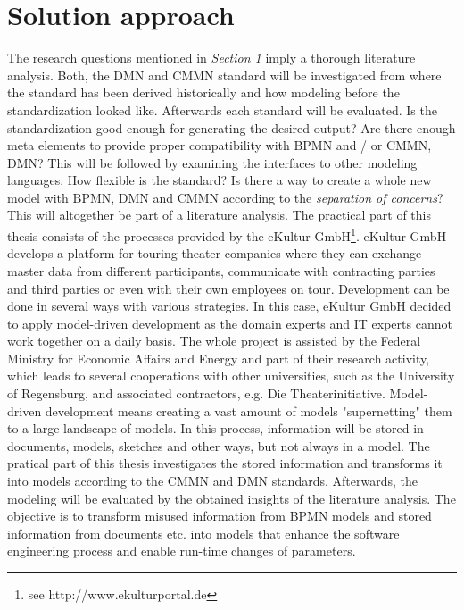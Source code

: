 \documentclass[11pt,a4paper,draft]{article}
\begin{document}
\section{Solution approach}
The research questions mentioned in \textit{Section 1} imply a thorough literature analysis. Both, the DMN and CMMN standard will be investigated from where the standard has been derived historically and how modeling before the standardization looked like. 
Afterwards each standard will be evaluated. Is the standardization good enough for generating the desired output? Are there enough meta elements to provide proper compatibility with BPMN and / or CMMN, DMN? This will be followed by examining the interfaces to other modeling languages. How flexible is the standard? Is there a way to create a whole new model with BPMN, DMN and CMMN according to the \textit{separation of concerns}? This will altogether be part of a literature analysis. 
The practical part of this thesis consists of the processes provided by the eKultur GmbH\footnote[1]{see http://www.ekulturportal.de}. eKultur GmbH develops a platform for touring theater companies where they can exchange master data from different participants, communicate with contracting parties and third parties or even with their own employees on tour. Development can be done in several ways with various strategies. In this case, eKultur GmbH decided to apply model-driven development as the domain experts and IT experts cannot work together on a daily basis. The whole project is assisted by the Federal Ministry for Economic Affairs and Energy and part of their research activity, which leads to several cooperations with other universities, such as the University of Regensburg, and associated contractors, e.g. Die Theaterinitiative. 
Model-driven development means creating a vast amount of models "supernetting" them to a large landscape of models. In this process, information will be stored in documents, models, sketches and other ways, but not always in a model. The pratical part of this thesis investigates the stored information and transforms it into models according to the CMMN and DMN standards. Afterwards, the modeling will be evaluated by the obtained insights of the literature analysis. The objective is to transform misused information from BPMN models and stored information from documents etc. into models that enhance the software engineering process and enable run-time changes of parameters. 
\end{document}
